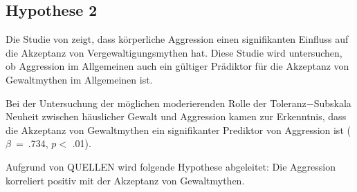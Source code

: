 \subsection{Hypothese 2}    \label{subsec_2.2.2}
Die Studie von \textcite{H2_u_3_Bhogal_2016} zeigt, dass körperliche Aggression einen signifikanten Einfluss auf die Akzeptanz von Vergewaltigungsmythen hat. Diese Studie wird untersuchen, ob Aggression im Allgemeinen auch ein gültiger Prädiktor für die Akzeptanz von Gewaltmythen im Allgemeinen ist.

Bei der Untersuchung der möglichen moderierenden Rolle der Toleranz$-$Subskala Neuheit zwischen häuslicher Gewalt und Aggression kamen \textcite{H1_moderation_2020} zur Erkenntnis, dass die Akzeptanz von Gewaltmythen ein signifikanter Prediktor von Aggression ist ($\beta$~=~.734, $p<$ .01).

Aufgrund von QUELLEN wird folgende Hypothese abgeleitet: Die Aggression korreliert positiv mit der Akzeptanz von Gewaltmythen.

